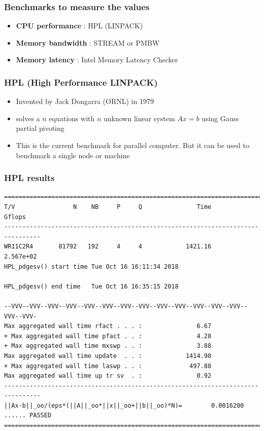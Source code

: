 \begin{frame}[containsverbatim]
\frametitle{Benchmarks to measure the values}
\begin{itemize}
	\item{\textbf{CPU performance} : HPL (LINPACK)}
	\item{\textbf{Memory bandwidth} : STREAM or PMBW }
	\item{\textbf{Memory latency} : Intel Memory Latency Checker}
\end{itemize}
\end{frame}

\begin{frame}[containsverbatim]
\frametitle{HPL (High Performance LINPACK)}
\begin{itemize}
	\item{Invented by Jack Dongarra (ORNL) in 1979}
	\item{solves a $n$ equations with $n$ unknown linear system $A x = b$ using Gauss partial pivoting}
	\item{This is the current benchmark for parallel computer. But it can be used to benchmark a single node or machine}
\end{itemize}
\end{frame}



\begin{frame}[containsverbatim]
\frametitle{HPL results}
\tiny
\begin{verbatim}
================================================================================
T/V                N    NB     P     Q               Time                 Gflops
--------------------------------------------------------------------------------
WR11C2R4       81792   192     4     4            1421.16              2.567e+02
HPL_pdgesv() start time Tue Oct 16 16:11:34 2018

HPL_pdgesv() end time   Tue Oct 16 16:35:15 2018

--VVV--VVV--VVV--VVV--VVV--VVV--VVV--VVV--VVV--VVV--VVV--VVV--VVV--VVV--VVV-
Max aggregated wall time rfact . . . :               6.67
+ Max aggregated wall time pfact . . :               4.28
+ Max aggregated wall time mxswp . . :               3.88
Max aggregated wall time update  . . :            1414.90
+ Max aggregated wall time laswp . . :             497.88
Max aggregated wall time up tr sv  . :               0.92
--------------------------------------------------------------------------------
||Ax-b||_oo/(eps*(||A||_oo*||x||_oo+||b||_oo)*N)=        0.0016200 ...... PASSED
================================================================================
\end{verbatim}
\end{frame}

